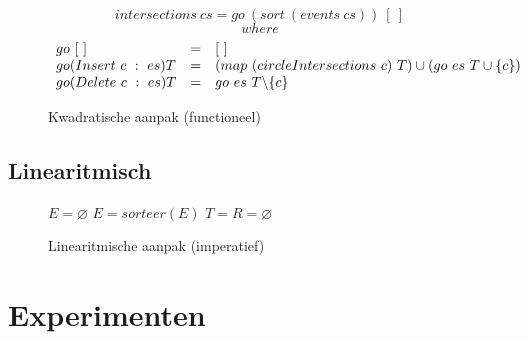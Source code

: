 \documentclass[12pt,a4paper]{article}
\begin{document}
\begin{figure}
\[
intersections\ cs = go\ (sort\ (events\ cs))\ [\ ]
\]
\[
where 
\]
\[
\begin{array}{l c l}
go\ [\ ] &= &[\ ]\\
go (Insert\ c\ :\ es) T &= &(map\ (circleIntersections\ c)\ T) \cup (go\ es\ T\cup\{c\})\\
go (Delete\ c\ :\ es) T &= &go\ es\ T\backslash\{c\}\\
\end{array}
\]
\label{naief_functioneel}
\caption{Kwadratische aanpak (functioneel)}
\end{figure}

\subsection{Linearitmisch}
\label{sec:linearitmisch}
\begin{figure}
  \begin{algorithm}[H]
    $E = \varnothing$\;
    $E = sorteer(E)$\;
    $T = R = \varnothing$\;
    \caption{Linearitmische aanpak (imperatief)}
  \end{algorithm}
\end{figure}


\section{Experimenten}






\end{document}
